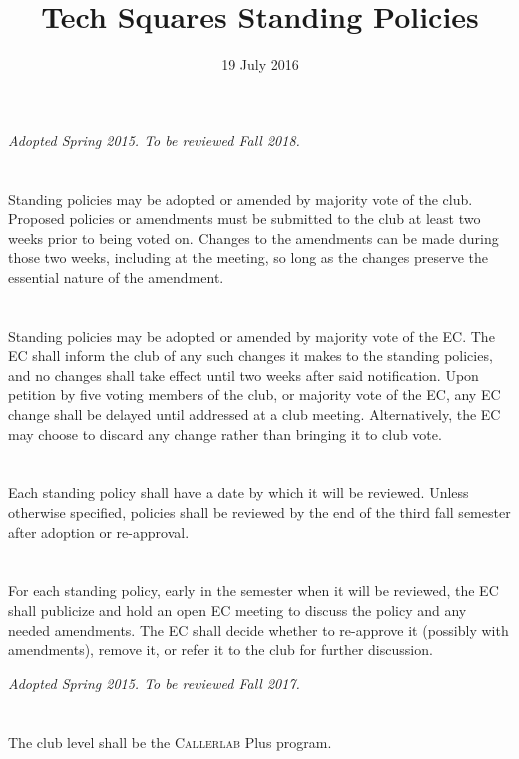 \documentclass{bylaws}
\title{Tech Squares Standing Policies}
\date{19 July 2016}
\newcommand{\sptimes}[2]{\emph{Adopted #1. To be reviewed #2.}}
\begin{document}
\maketitle

\label{pol:adopt}
\sptimes{Spring 2015}{Fall 2018}
\section{}Standing policies may be adopted or amended by majority vote of the club. Proposed policies or amendments must be submitted to the club at least two weeks prior to being voted on. Changes to the amendments can be made during those two weeks, including at the meeting, so long as the changes preserve the essential nature of the amendment.
\section{}Standing policies may be adopted or amended by majority vote of the EC. The EC shall inform the club of any such changes it makes to the standing policies, and no changes shall take effect until two weeks after said notification. Upon petition by five voting members of the club, or majority vote of the EC, any EC change shall be delayed until addressed at a club meeting. Alternatively, the EC may choose to discard any change rather than bringing it to club vote.
\section{}Each standing policy shall have a date by which it will be reviewed. Unless otherwise specified, policies shall be reviewed by the end of the third fall semester after adoption or re-approval.
\section{}For each standing policy, early in the semester when it will be reviewed, the EC shall publicize and hold an open EC meeting to discuss the policy and any needed amendments. The EC shall decide whether to re-approve it (possibly with amendments), remove it, or refer it to the club for further discussion.


\sptimes{Spring 2015}{Fall 2017}
\section{}The club level shall be the \textsc{Callerlab} Plus program.
\end{document}
